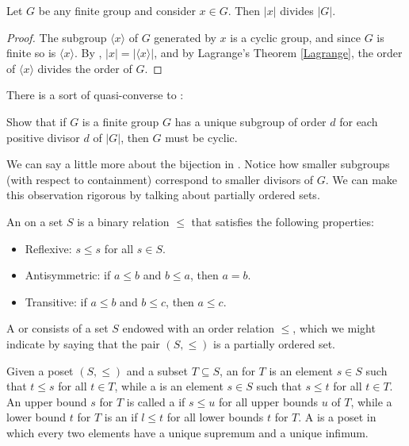 \begin{corollary}
	Let $G$ be any finite group and consider $x \in G$. Then $|x|$ divides $|G|$.
\end{corollary}


\begin{proof}
	The subgroup $\langle x \rangle$ of $G$ generated by $x$ is a cyclic group, and since $G$ is finite so is $\langle x \rangle$. By , $|x| = |\langle x \rangle|$, and by Lagrange's Theorem \ref{Lagrange}, the order of $\langle x \rangle$ divides the order of $G$.
\end{proof}


There is a sort of quasi-converse to :

\begin{exercise} 
Show that if $G$ is a finite group $G$ has a unique subgroup of order $d$ for each positive divisor $d$ of $|G|$, then $G$ must be cyclic.
\end{exercise}


We can say a little more about the bijection in . Notice how smaller subgroups (with respect to containment) correspond to smaller divisors of $G$. We can make this observation rigorous by talking about partially ordered sets. 

\begin{definition}
An  on a set $S$ is a binary relation $\leq$ that satisfies the following properties:
\begin{itemize}[itemsep=0.1em]
	\item Reflexive: $s \leq s$ for all $s \in S$.
	\item Antisymmetric: if $a\leq b$ and $b\leq a$, then $a=b$.
	\item Transitive: if $a\leq b$ and $b\leq c$, then $a \leq c$.
\end{itemize}
A  or  consists of a set $S$ endowed with an order relation $\leq$, which we might indicate by saying that the pair $(S,\leq)$ is a partially ordered set. 

Given a poset $(S, \leq)$ and a subset $T \subseteq S$, an  for $T$ is an element $s \in S$ such that $t \leq s$ for all $t \in T$, while a  is an element $s \in S$ such that $s \leq t$ for all $t \in T$.
An upper bound $s$ for $T$ is called a  if $s \leq u$ for all upper bounds $u$ of $T$, while a lower bound $t$ for $T$ is an  if $l \leq t$ for all lower bounds $t$ for $T$.
A  is a poset in which every two elements have a unique supremum and a unique infimum.
\end{definition}


